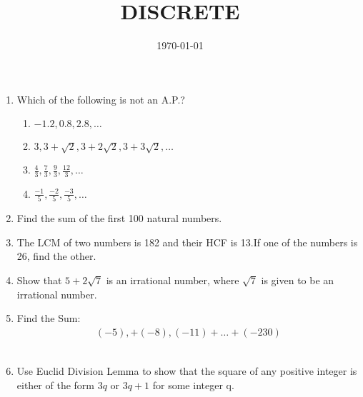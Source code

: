 \documentclass{article}
\title{DISCRETE}
\date{ \today}
\begin{document}
\maketitle
\begin{enumerate}
\section*{DISCRETE CBSE-10}
\item Which of the following is not an A.P.? 
	\begin{enumerate}[label =(\Alph*)]
	\item $-1.2,0.8,2.8,\dots$ 

	\item $3,3+\sqrt2,3+2\sqrt2,3+3\sqrt2,\dots$ 

	\item $\frac{4}{3},\frac{7}{3},\frac{9}{3},\frac{12}{3},\dots$ 

	\item $\frac{-1}{5},\frac{-2}{5},\frac{-3}{5},\dots$ \\
\end{enumerate}
\item Find the sum of the first 100 natural numbers.\\
						     
\item The LCM of two numbers is 182 and their HCF is 13.If one of the numbers is 26, find the other.\\

\item Show that $5+2\sqrt7$ is an irrational number, where $\sqrt7$ is given to be an irrational number.
\\
\item Find the Sum:
	\begin{align}
	(-5),+(-8),(-11)+\dots+(-230)
        \end{align}
\\
\item Use Euclid Division Lemma to show that the square of any positive 
integer is either of the form $3q$ or $3q+1$ for some integer q.
\end{enumerate}
\end{document}
